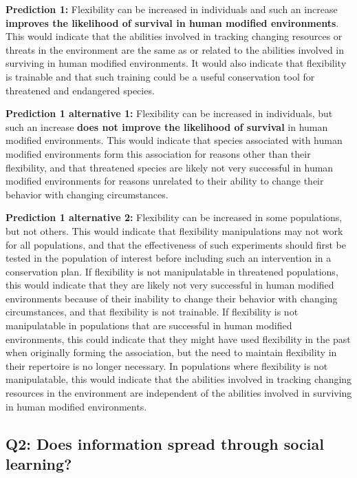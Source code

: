 \documentclass[
]{article}
\begin{document}
\textbf{Prediction 1:} Flexibility can be increased in individuals and
such an increase \textbf{improves the likelihood of survival in human
modified environments}. This would indicate that the abilities involved
in tracking changing resources or threats in the environment are the
same as or related to the abilities involved in surviving in human
modified environments. It would also indicate that flexibility is
trainable and that such training could be a useful conservation tool for
threatened and endangered species.

\textbf{Prediction 1 alternative 1:} Flexibility can be increased in
individuals, but such an increase \textbf{does not improve the
likelihood of survival} in human modified environments. This would
indicate that species associated with human modified environments form
this association for reasons other than their flexibility, and that
threatened species are likely not very successful in human modified
environments for reasons unrelated to their ability to change their
behavior with changing circumstances.

\textbf{Prediction 1 alternative 2:} Flexibility can be increased in
some populations, but not others. This would indicate that flexibility
manipulations may not work for all populations, and that the
effectiveness of such experiments should first be tested in the
population of interest before including such an intervention in a
conservation plan. If flexibility is not manipulatable in threatened
populations, this would indicate that they are likely not very
successful in human modified environments because of their inability to
change their behavior with changing circumstances, and that flexibility
is not trainable. If flexibility is not manipulatable in populations
that are successful in human modified environments, this could indicate
that they might have used flexibility in the past when originally
forming the association, but the need to maintain flexibility in their
repertoire is no longer necessary. In populations where flexibility is
not manipulatable, this would indicate that the abilities involved in
tracking changing resources in the environment are independent of the
abilities involved in surviving in human modified environments.

\hypertarget{q2-does-information-spread-through-social-learning}{%
\subsection{Q2: Does information spread through social
learning?}\label{q2-does-information-spread-through-social-learning}}
\end{document}

